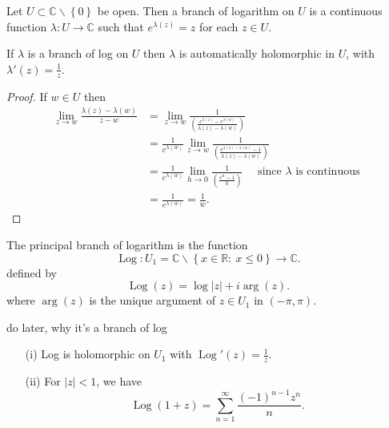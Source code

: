 \documentclass[a4paper]{scrartcl}
\begin{document}
\begin{definition}
      Let $U \subset \mathbb{C} \backslash \left\{0\right\}$ be open. Then a branch of logarithm on $U$ is a continuous function $\lambda: U \rightarrow \mathbb{C}$ such that $e^{\lambda (z)}=z$ for each $z \in U$.
\end{definition}
\begin{proposition}
      If $\lambda$ is a branch of log on $U$ then $\lambda$ is automatically holomorphic in $U$, with $\lambda' (z)=\frac{1}{z}$.
\end{proposition}
\begin{proof}
      If $w \in U$ then 
      \begin{align*}
           \lim_{z \rightarrow w} \frac{\lambda (z)- \lambda (w)}{z-w}&=\lim_{z \rightarrow w} \frac{1}{\left( \frac{e^{\lambda (z)}-e^{\lambda (w)}}{\lambda (z)- \lambda (w)}\right)}\\
           &=\frac{1}{e^{\lambda (w)}}\lim_{z \rightarrow w} \frac{1}{\left(\frac{e^{\lambda (z)-\lambda (w)}-1}{\lambda (z)- \lambda (w)}\right)}\\
           &=\frac{1}{e^{\lambda (w)}} \lim_{h \rightarrow 0} \frac{1}{\left( \frac{e^{h}-1}{h}\right)} \quad \text{ since } \lambda \text{ is continuous } \\
           &=\frac{1}{e^{\lambda (w)}}=\frac{1}{w}.
      \end{align*}
\end{proof}
\begin{definition}
      The principal branch of logarithm is the function \[
      \operatorname{Log}: U_1 =\mathbb{C} \backslash \left\{x \in \mathbb{R}: \ x \leq 0\right\} \rightarrow \mathbb{C}
      .\] defined by \[
      \operatorname{Log}(z)= \operatorname{log}|z|+i \operatorname{arg}(z)
      .\] where $\operatorname{arg}(z)$ is the unique argument of $z \in U_1 $ in $(-\pi,\pi)$.
\end{definition}
\begin{remark}
      do later, why it's a branch of log
\end{remark}
\begin{proposition}
      \begin{itemize}
           \item[(i)] Log is holomorphic on $U_1 $ with $\operatorname{Log}' (z)=\frac{1}{z}$. 
           \item[(ii)] For $|z|<1$, we have \[
           \operatorname{Log}(1+z)=\sum_{n=1}^{ \infty} \frac{(-1)^{n-1}z^{n}}{n}
           .\] 
      \end{itemize} 
\end{proposition}
\end{document}

